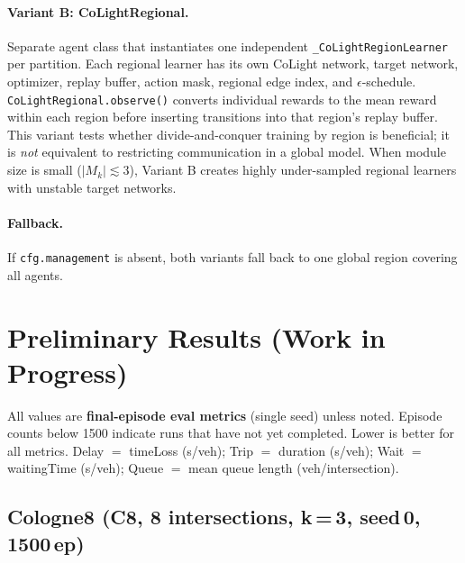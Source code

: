 \documentclass{article}
\begin{document}
\paragraph{Variant B: CoLightRegional.}
Separate agent class that instantiates one independent
\texttt{\_CoLightRegionLearner} per partition.
Each regional learner has its own CoLight network, target network, optimizer,
replay buffer, action mask, regional edge index, and $\epsilon$-schedule.
\texttt{CoLightRegional.observe()} converts individual rewards to the mean
reward within each region before inserting transitions into that region's
replay buffer.
This variant tests whether divide-and-conquer training by region is beneficial;
it is \emph{not} equivalent to restricting communication in a global model.
When module size is small ($|M_k| \lesssim 3$), Variant B creates highly
under-sampled regional learners with unstable target networks.

\paragraph{Fallback.}
If \texttt{cfg.management} is absent, both variants fall back to one global
region covering all agents.

\section{Preliminary Results (Work in Progress)}
\label{app:results}

All values are \textbf{final-episode eval metrics} (single seed) unless noted.
Episode counts below 1500 indicate runs that have not yet completed.
Lower is better for all metrics.
Delay $=$ timeLoss (s/veh); Trip $=$ duration (s/veh);
Wait $=$ waitingTime (s/veh); Queue $=$ mean queue length (veh/intersection).

\subsection{Cologne8 (C8, 8 intersections, k\,=\,3, seed\,0, 1500\,ep)}
\label{app:results:c8}
\end{document}
